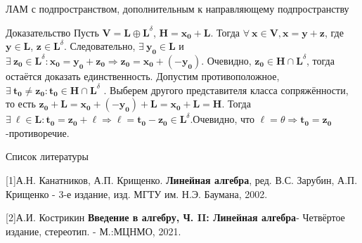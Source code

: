 \documentclass{beamer}
\begin{document}
\begin{frame}{ ЛАМ с подпространством, дополнительным к направляющему подпространству}
\begin{block}{Доказательство}
    Пусть $\mathbf{V}=\mathbf{L}\oplus \mathbf{L}^\delta$, $\mathbf{H}=\mathbf{x_0}+\mathbf{L}$. Тогда $\forall\:\mathbf{x} \in \mathbf{V},    \mathbf{x}=\mathbf{y}+\mathbf{z}$, где $\mathbf{y}\in\mathbf{L}$, $\mathbf{z}\in\mathbf{L}^\delta$.
    Следовательно, $\exists\:\mathbf{y_0}\in\mathbf{L}$ и $\exists\:\mathbf{z_0}\in\mathbf{L}^\delta:\mathbf{x_0}=\mathbf{y_0}+\mathbf{z_0}\Rightarrow\mathbf{z_0}=\mathbf{x_0}+(-\mathbf{y_0})$. Очевидно, $\mathbf{z_0}\in\mathbf{H}\cap\mathbf{L}^\delta$, тогда остаётся доказать единственность. Допустим противоположное, $\exists\: \mathbf{t_0}\neq\mathbf{z_0}:\mathbf{t_0}\in\mathbf{H}\cap\mathbf{L}^\delta$ . Выберем другого представителя класса сопряжённости, то есть $\mathbf{z_0}+\mathbf{L}=\mathbf{x_0}+(-\mathbf{y_0})+\mathbf{L}=\mathbf{x_0}+\mathbf{L}=\mathbf{H}$.
    Тогда
    $\exists\:\mathbf{\ell }\in\mathbf{L}:\mathbf{t_0}=\mathbf{z_0}+\mathbf{\ell }\Rightarrow \mathbf{\ell}=\mathbf{t_0 }-\mathbf{z_0}\in\mathbf{L}^\delta$.Очевидно, что $\mathbf{\ell }=\theta\Rightarrow\mathbf{t_0}=\mathbf{z_0}$-противоречие.
\end{block}

\end{frame}



\begin{frame}{Список литературы}
  
    [1]А.Н. Канатников, А.П. Крищенко. {\bf Линейная алгебра}, ред. В.С. Зарубин, А.П. Крищенко
    - 3-е издание, изд. МГТУ им. Н.Э. Баумана, 2002.
    
    [2]А.И. Кострикин {\bf Введение в алгебру, Ч. II: Линейная алгебра}- Четвёртое издание, стереотип. - М.:МЦНМО, 2021.
\end{frame}
\end{document}
